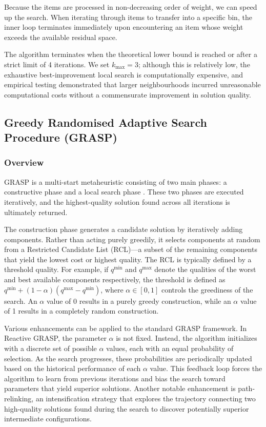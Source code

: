 \documentclass[11pt]{article}
\begin{document}
Because the items are processed in non-decreasing order of weight, we can 
speed up the search. When iterating through items to transfer into a specific 
bin, the inner loop terminates immediately upon encountering an item whose 
weight exceeds the available residual space.

The algorithm terminates when the theoretical lower bound is reached or after 
a strict limit of 4 iterations. We set $k_{\max} = 3$; although this is 
relatively low, the exhaustive best-improvement local search is computationally 
expensive, and empirical testing demonstrated that larger neighbourhoods 
incurred unreasonable computational costs without a commensurate improvement 
in solution quality.

\subsection{Greedy Randomised Adaptive Search Procedure (GRASP)}

\subsubsection{Overview}
GRASP is a multi-start metaheuristic consisting of two main phases: a constructive phase and a local search phase \cite{gendreau}. These two phases are executed iteratively, and the highest-quality solution found across all iterations is ultimately returned. 

The construction phase generates a candidate solution by iteratively adding components. Rather than acting purely greedily, it selects components at random from a Restricted Candidate List (RCL)—a subset of the remaining components that yield the lowest cost or highest quality. The RCL is typically defined by a threshold quality. For example, if $q^{\min}$ and $q^{\max}$ denote the qualities of the worst and best available components respectively, the threshold is defined as $q^{\min} + (1 - \alpha)(q^{\max} - q^{\min})$, where $\alpha \in [0, 1]$ controls the greediness of the search. An $\alpha$ value of 0 results in a purely greedy construction, while an $\alpha$ value of 1 results in a completely random construction. 

Various enhancements can be applied to the standard GRASP framework. In Reactive GRASP, the parameter $\alpha$ is not fixed. Instead, the algorithm initializes with a discrete set of possible $\alpha$ values, each with an equal probability of selection. As the search progresses, these probabilities are periodically updated based on the historical performance of each $\alpha$ value. This feedback loop forces the algorithm to learn from previous iterations and bias the search toward parameters that yield superior solutions. Another notable enhancement is path-relinking, an intensification strategy that explores the trajectory connecting two high-quality solutions found during the search to discover potentially superior intermediate configurations.
\end{document}
